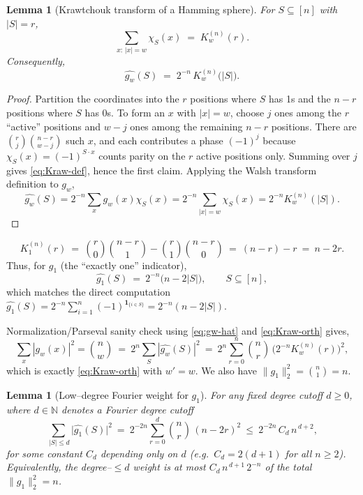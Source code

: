 \documentclass[a4paper,onecolumn,11pt,unpublished]{quantumarticle}
\newtheorem{lemma}[theorem]{Lemma}
\theoremstyle{remark}
\begin{document}
\begin{lemma}[Krawtchouk transform of a Hamming sphere]
\label{lem:layer-sum-kraw}
For $S\subseteq[n]$ with $|S|=r$,
\[
  \sum_{x:\,|x|=w} \chi_S(x) \;=\; K_w^{(n)}(r).
\]
Consequently,
\begin{equation}
  \widehat{g_w}(S) \;=\; 2^{-n}\,K_w^{(n)}\!\bigl(|S|\bigr).
  \label{eq:gw-hat}
\end{equation}
\end{lemma}

\begin{proof}
Partition the coordinates into the $r$ positions where $S$ has 1s and the $n-r$ positions where $S$ has 0s.
To form an $x$ with $|x|=w$, choose $j$ ones among the $r$ ``active'' positions and $w-j$ ones among the remaining $n-r$ positions.
There are $\binom{r}{j}\binom{n-r}{w-j}$ such $x$, and each contributes a phase $(-1)^j$ because $\chi_S(x)=(-1)^{S\cdot x}$ counts parity on the $r$ active positions only.
Summing over $j$ gives \eqref{eq:Kraw-def}, hence the first claim.
Applying the Walsh transform definition to $g_w$,
\[
  \widehat{g_w}(S)=2^{-n}\sum_{x} g_w(x)\chi_S(x) 
  = 2^{-n}\sum_{|x|=w}\chi_S(x)=2^{-n}K_w^{(n)}(|S|).
\]
\end{proof}

\[
  K_{1}^{(n)}(r)\ =\ \binom{r}{0}\binom{n-r}{1}-\binom{r}{1}\binom{n-r}{0}
  \ =\ (n-r)-r\ =\ n-2r.
\]
Thus, for $g_1$ (the ``exactly one'' indicator),
\begin{equation}
  \widehat{g_1}(S)\ =\ 2^{-n}\bigl(n-2|S|\bigr),
  \qquad S\subseteq[n],
  \label{eq:onehot-transform}
\end{equation}
which matches the direct computation $\widehat{g_1}(S)=2^{-n}\sum_{i=1}^{n}(-1)^{\mathbf{1}_{\{i\in S\}}}=2^{-n}(n-2|S|)$.

Normalization/Parseval sanity check  using \eqref{eq:gw-hat} and \eqref{eq:Kraw-orth} gives,
\[
  \sum_{x}|g_w(x)|^2 = \binom{n}{w}
  \ =\ 2^{n}\sum_{S}|\widehat{g_w}(S)|^2
  \ =\ 2^{n}\sum_{r=0}^{n}\binom{n}{r}\,\bigl(2^{-n}K_w^{(n)}(r)\bigr)^2,
\]
which is exactly \eqref{eq:Kraw-orth} with $w'=w$. We also have
$\|g_1\|_2^2=\binom{n}{1}=n$.

\begin{lemma}[Low–degree Fourier weight for $g_1$]
\label{lem:onehot-lowdeg}
For any fixed degree cutoff $d\ge 0$, where $d\in\mathbb{N}$ denotes a \emph{Fourier degree cutoff}
\[
  \sum_{\,|S|\le d}\! \bigl|\widehat{g_1}(S)\bigr|^2
  \ =\ 2^{-2n}\sum_{r=0}^{d} \binom{n}{r}\,(n-2r)^2
  \ \le\ 2^{-2n}\,C_d\,n^{\,d+2},
\]
for some constant $C_d$ depending only on $d$ (e.g.\ $C_d=2(d+1)$ for all $n\ge 2$).
Equivalently, the degree–$\le d$ weight is at most $C_d\,n^{\,d+1}\,2^{-n}$ of the total $\|g_1\|_2^2=n$.
\end{lemma}
\end{document}
